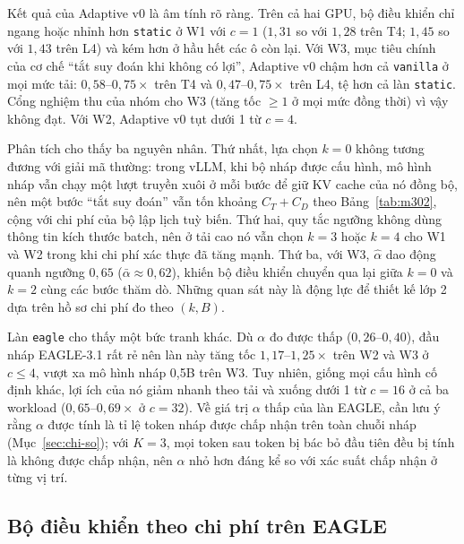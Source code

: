 





Kết quả của Adaptive v0 là âm tính rõ ràng. Trên cả hai GPU, bộ điều khiển chỉ ngang hoặc nhỉnh hơn \texttt{static} ở W1 với $c=1$ ($1{,}31$ so với $1{,}28$ trên T4; $1{,}45$ so với $1{,}43$ trên L4) và kém hơn ở hầu hết các ô còn lại. Với W3, mục tiêu chính của cơ chế ``tắt suy đoán khi không có lợi'', Adaptive v0 chậm hơn cả \texttt{vanilla} ở mọi mức tải: $0{,}58$--$0{,}75\times$ trên T4 và $0{,}47$--$0{,}75\times$ trên L4, tệ hơn cả làn \texttt{static}. Cổng nghiệm thu của nhóm cho W3 (tăng tốc $\ge 1$ ở mọi mức đồng thời) vì vậy không đạt. Với W2, Adaptive v0 tụt dưới 1 từ $c = 4$.

Phân tích cho thấy ba nguyên nhân. Thứ nhất, lựa chọn $k = 0$ không tương đương với giải mã thường: trong vLLM, khi bộ nháp được cấu hình, mô hình nháp vẫn chạy một lượt truyền xuôi ở mỗi bước để giữ KV cache của nó đồng bộ, nên một bước ``tắt suy đoán'' vẫn tốn khoảng $C_T + C_D$ theo Bảng~\ref{tab:m302}, cộng với chi phí của bộ lập lịch tuỳ biến. Thứ hai, quy tắc ngưỡng không dùng thông tin kích thước batch, nên ở tải cao nó vẫn chọn $k = 3$ hoặc $k = 4$ cho W1 và W2 trong khi chi phí xác thực đã tăng mạnh. Thứ ba, với W3, $\hat\alpha$ dao động quanh ngưỡng $0{,}65$ ($\bar\alpha \approx 0{,}62$), khiến bộ điều khiển chuyển qua lại giữa $k = 0$ và $k = 2$ cùng các bước thăm dò. Những quan sát này là động lực để thiết kế lớp 2 dựa trên hồ sơ chi phí đo theo $(k, B)$.

Làn \texttt{eagle} cho thấy một bức tranh khác. Dù $\alpha$ đo được thấp ($0{,}26$--$0{,}40$), đầu nháp EAGLE-3.1 rất rẻ nên làn này tăng tốc $1{,}17$--$1{,}25\times$ trên W2 và W3 ở $c \le 4$, vượt xa mô hình nháp 0,5B trên W3. Tuy nhiên, giống mọi cấu hình cố định khác, lợi ích của nó giảm nhanh theo tải và xuống dưới 1 từ $c = 16$ ở cả ba workload ($0{,}65$--$0{,}69\times$ ở $c = 32$). Về giá trị $\alpha$ thấp của làn EAGLE, cần lưu ý rằng $\alpha$ được tính là tỉ lệ token nháp được chấp nhận trên toàn chuỗi nháp (Mục~\ref{sec:chi-so}); với $K=3$, mọi token sau token bị bác bỏ đầu tiên đều bị tính là không được chấp nhận, nên $\alpha$ nhỏ hơn đáng kể so với xác suất chấp nhận ở từng vị trí.

\subsection{Bộ điều khiển theo chi phí trên EAGLE}
\label{subsec:kq-r6}

